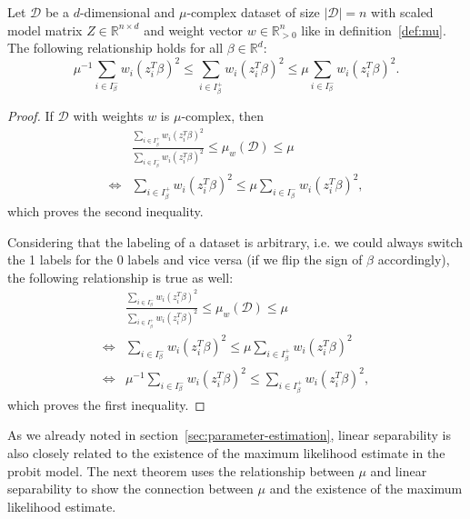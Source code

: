 \begin{lemma}
    \label{lemma:mu-inequalities}
    Let $\mathcal{D}$ be a $d$-dimensional and $\mu$-complex dataset of size
    $|\mathcal{D}|=n$ with scaled
    model matrix $Z \in \mathbb{R}^{n \times d}$ and weight
    vector $w \in \mathbb{R}^n_{>0}$ like in
    definition~\ref{def:mu}.
    The following relationship holds for all $\beta \in \mathbb{R}^d$:
    \begin{equation*}
        \mu^{-1} \sum_{i \in I_\beta^-} w_i (z_i^T \beta)^2
        \leq \sum_{i \in I_\beta^+} w_i (z_i^T \beta)^2
        \leq \mu \sum_{i \in I_\beta^-} w_i (z_i^T \beta)^2.
    \end{equation*}
\end{lemma}
\begin{proof}
    If $\mathcal{D}$ with weights $w$ is $\mu$-complex, then
    \begin{align*}
             & \frac{\sum_{i \in I_\beta^+} w_i (z_i^T \beta)^2}{\sum_{i \in I_\beta^-} w_i (z_i^T \beta)^2}
        \leq \mu_w(\mathcal{D}) \leq \mu                                                                     \\
        \iff &
        \sum_{i \in I_\beta^+} w_i (z_i^T \beta)^2
        \leq \mu \sum_{i \in I_\beta^-} w_i (z_i^T \beta)^2,
    \end{align*}
    which proves the second inequality.

    Considering that the labeling of a dataset is arbitrary, i.e. we
    could always switch the 1 labels for the 0 labels and vice versa
    (if we flip the sign of $\beta$
    accordingly),
    the following relationship is true as well:
    \begin{align*}
             & \frac{\sum_{i \in I_\beta^-} w_i (z_i^T \beta)^2}{\sum_{i \in I_\beta^+} w_i (z_i^T \beta)^2}
        \leq \mu_w(\mathcal{D}) \leq \mu                                                                     \\
        \iff &
        \sum_{i \in I_\beta^-} w_i (z_i^T \beta)^2
        \leq \mu \sum_{i \in I_\beta^+} w_i (z_i^T \beta)^2                                                  \\
        \iff &
        \mu^{-1} \sum_{i \in I_\beta^-} w_i (z_i^T \beta)^2
        \leq \sum_{i \in I_\beta^+} w_i (z_i^T \beta)^2,
    \end{align*}
    which proves the first inequality.
\end{proof}


As we already noted in section~\ref{sec:parameter-estimation},
linear separability is also closely related to the existence
of the maximum likelihood estimate in the probit model.
The next theorem uses the relationship between $\mu$ and
linear separability to show the connection between $\mu$
and the existence of the maximum likelihood estimate.

